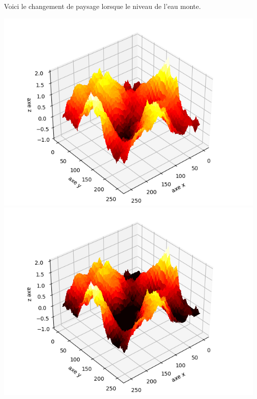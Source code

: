 \documentclass[11pt,class=report,crop=false]{standalone}
\begin{document}
\begin{exemple}
Voici le changement de paysage lorsque le niveau de l'eau monte.

\begin{center}
\includegraphics[scale=\myscale,scale=0.4]{figures/diamant-carre-03-1}
\includegraphics[scale=\myscale,scale=0.4]{figures/diamant-carre-03-2}


\end{center}
\end{exemple}
\end{document}

